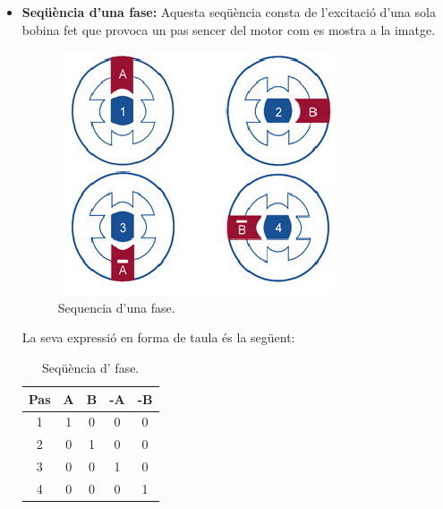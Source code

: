 \begin{itemize}
	\item \textbf{Seqüència d'una fase:} Aquesta seqüència consta de l'excitació d'una sola bobina fet que provoca un pas sencer del motor com es mostra a la imatge.  
	\begin{figure}[H]
		\centering
		\includegraphics[scale=1.2]{Sequencia_1_fase.eps}
		\caption{Sequencia d'una fase.}
		\label{fig:1fase}
	\end{figure}
	La seva expressió en forma de taula és la següent:
	\begin{table}[H]
		\begin{center}
			\begin{tabular}{|c||c|c|c|c|}
				\hline
				Pas & A & B & -A & -B \\
				\hline \hline
				1 & 1 & 0 & 0 & 0 \\ \hline
				2 & 0 & 1 & 0 & 0 \\ \hline
				3 & 0 & 0 & 1 & 0 \\ \hline
				4 & 0 & 0 & 0 & 1 \\ \hline
			\end{tabular}
			\caption{Seqüència d' fase.}
			\label{tabla:1fase}
		\end{center}
	\end{table}
	

\end{itemize}
